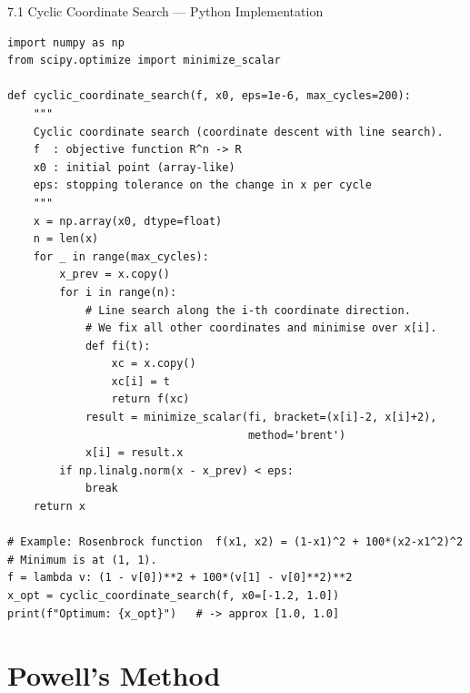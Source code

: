 \documentclass[aspectratio=169,10pt]{beamer}
\begin{document}
\begin{frame}[fragile]{7.1 Cyclic Coordinate Search --- Python Implementation}
\begin{lstlisting}[style=python, caption={Cyclic coordinate search in Python (NumPy/SciPy)}]
import numpy as np
from scipy.optimize import minimize_scalar

def cyclic_coordinate_search(f, x0, eps=1e-6, max_cycles=200):
    """
    Cyclic coordinate search (coordinate descent with line search).
    f  : objective function R^n -> R
    x0 : initial point (array-like)
    eps: stopping tolerance on the change in x per cycle
    """
    x = np.array(x0, dtype=float)
    n = len(x)
    for _ in range(max_cycles):
        x_prev = x.copy()
        for i in range(n):
            # Line search along the i-th coordinate direction.
            # We fix all other coordinates and minimise over x[i].
            def fi(t):
                xc = x.copy()
                xc[i] = t
                return f(xc)
            result = minimize_scalar(fi, bracket=(x[i]-2, x[i]+2),
                                     method='brent')
            x[i] = result.x
        if np.linalg.norm(x - x_prev) < eps:
            break
    return x

# Example: Rosenbrock function  f(x1, x2) = (1-x1)^2 + 100*(x2-x1^2)^2
# Minimum is at (1, 1).
f = lambda v: (1 - v[0])**2 + 100*(v[1] - v[0]**2)**2
x_opt = cyclic_coordinate_search(f, x0=[-1.2, 1.0])
print(f"Optimum: {x_opt}")   # -> approx [1.0, 1.0]
\end{lstlisting}
\end{frame}

\section{Powell's Method}
\end{document}
